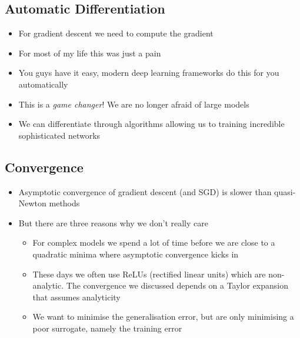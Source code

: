 
\begin{slide}
  \section{Automatic Differentiation}

\begin{PauseHighLight}
  \begin{itemize}
  \item For gradient descent we need to compute the gradient\pause
  \item For most of my life this was just a pain\pause
  \item You guys have it easy, modern deep learning frameworks do this
    for you automatically\pause
  \item This is a \textit{game changer}!\pause{}  We are no longer afraid of
    large models\pause
  \item We can differentiate through algorithms allowing us to
    training incredible sophisticated networks\pause
  \end{itemize}
\end{PauseHighLight}


\end{slide}


\begin{slide}
\section{Convergence}

\begin{PauseHighLight}
  \begin{itemize}
  \item Asymptotic convergence of gradient descent (and SGD) is slower
    than quasi-Newton methods\pause
  \item But there are three reasons why we don't really care\pause
    \begin{itemize}
    \item For complex models we spend a lot of time before we are
      close to a quadratic minima where asymptotic convergence kicks
      in\pause
    \item These days we often use ReLUs (rectified linear units) which
      are non-analytic.  The convergence we discussed depends on a
      Taylor expansion that assumes analyticity\pause
    \item We want to minimise the generalisation error, but are only
      minimising a poor surrogate, namely the training error\pause
    \end{itemize}
        
  \end{itemize}
\end{PauseHighLight}

\end{slide}



